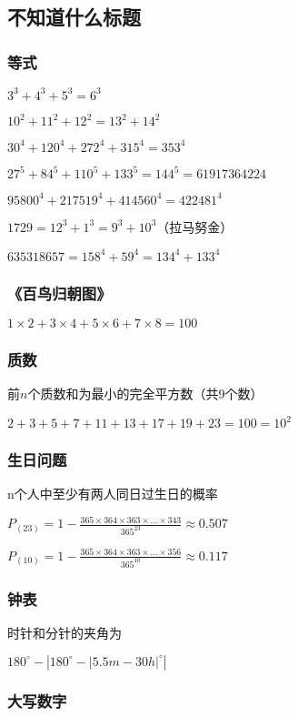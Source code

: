\documentclass[UTF8]{ctexart}
\begin{document}
\subsection{不知道什么标题}

\subsubsection{等式}

$3^3+4^3+5^3=6^3$

$10^2+11^2+12^2=13^2+14^2$

$30^4+120^4+272^4+315^4=353^4$

$27^5+84^5+110^5+133^5=144^5=61 917 364 224$

$95800^4+217519^4+414560^4=422 481^4$

$1729=12^3+1^3=9^3+10^3$（拉马努金）

$635318657=158^4+59^4=134^4+133^4$

\subsubsection{《百鸟归朝图》}

$1\times2+3\times4+5\times6+7\times8=100$

\subsubsection{质数}
前$n$个质数和为最小的完全平方数（共9个数）

\noindent$ 2+3+5+7+11+13+17+19+23=100=10^2 $

\subsubsection{生日问题}n个人中至少有两人同日过生日的概率

$P_{(23)}=1-\frac{365\times 364\times 363\times ...\times 343}{365^{23} }  \approx 0.507$

$P_{(10)}=1-\frac{365\times 364\times 363\times ...\times 356}{365^{10} }  \approx 0.117$

\subsubsection{钟表}时针和分针的夹角为

$180^{\circ}-\left | 180^{\circ}-\left | 5.5m-30h \right |^{\circ}  \right | $

\subsubsection{大写数字}
\end{document}

